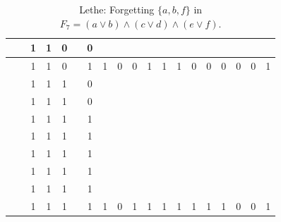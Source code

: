 \begin{table}[!tb]
\begin{tabular}{|c|c|c|c|c|c|c|c|c|c|c|c|c|c|c|c|c|c|c|}
        \rowcolor{blue!40}  &  & 1 & 1 & 0 &  & 0 &  &  &  &  &  &  &  &  &  &  &  &  \\ \hline
        \rowcolor{blue!40}  &  & 1 & 1 & 0 &  & 1 & 1 & 0 & 0 & 1 & 1 & 1 & 0 & 0 & 0 & 0 & 0 & 1 \\ \hline
        \rowcolor{red!40}  &  & 1 & 1 & 1 &  & 0 &  &  &  &  &  &  &  &  &  &  &  &  \\ \hline
        \rowcolor{red!40}  &  & 1 & 1 & 1 &  & 0 &  &  &  &  &  &  &  &  &  &  &  &  \\ \hline
        \rowcolor{red!40}  &  & 1 & 1 & 1 &  & 1 &  &  &  &  &  &  &  &  &  &  &  &  \\ \hline
        \rowcolor{red!40}  &  & 1 & 1 & 1 &  & 1 &  &  &  &  &  &  &  &  &  &  &  &  \\ \hline
        \rowcolor{red!40}  &  & 1 & 1 & 1 &  & 1 &  &  &  &  &  &  &  &  &  &  &  &  \\ \hline
        \rowcolor{red!40}  &  & 1 & 1 & 1 &  & 1 &  &  &  &  &  &  &  &  &  &  &  &  \\ \hline
        \rowcolor{red!40}  &  & 1 & 1 & 1 &  & 1 &  &  &  &  &  &  &  &  &  &  &  &  \\ \hline
        \rowcolor{red!40}  &  & 1 & 1 & 1 &  & 1 & 1 & 0 & 1 & 1 & 1 & 1 & 1 & 1 & 1 & 0 & 0 & 1 \\ \hline
    \end{tabular}
    \caption{Lethe: Forgetting $\{a, b, f\}$ in $F_{7} = (a \lor b) \land (c \lor d) \land (e \lor f)$.}
    \label{tab:lethe-F7-abf}
\end{table}
